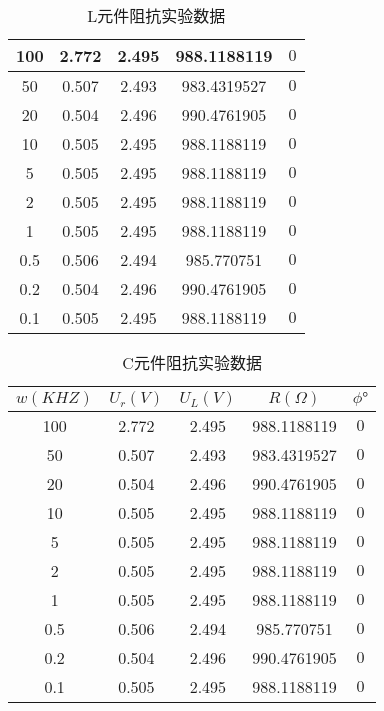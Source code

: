 \documentclass[dvipsnames, svgnames,a4paper,11pt]{article}
\begin{document}
\begin{enumerate}
\begin{table}[h]
\begin{tabular}{|c|c|c|c|c|}
				100   & 2.772 & 2.495 & 988.1188119 & $0 $\\
				\hline
				50  & 0.507 & 2.493 & 983.4319527 &$0 $\\
				\hline
				20   & 0.504 & 2.496 & 990.4761905 & $0 $\\
				\hline
				10  & 0.505 & 2.495 & 988.1188119 &$0 $ \\
				\hline
				5   & 0.505 & 2.495 & 988.1188119 &$0 $ \\
				\hline
				2   & 0.505 & 2.495 & 988.1188119 & $0 $\\
				\hline
				1   & 0.505 & 2.495 & 988.1188119 & $0 $\\
				\hline
				0.5   & 0.506 & 2.494 & 985.770751 & $0 $\\
				\hline
				0.2   & 0.504 & 2.496 & 990.4761905 & $0 $\\
				\hline
				0.1   & 0.505 & 2.495 &988.1188119 &$0 $ \\
				\hline
				
				\end{tabular}
				\caption{L元件阻抗实验数据}
				
				\end{table}
				\begin{table}[h]
					\centering
					\begin{tabular}{|c|c|c|c|c|}
					\hline
					$w(KHZ)$ & $U_r(V)$ & $U_L(V)$ & $R(\Omega)$ & $\phi °$ \\
					\hline
					
					100   & 2.772 & 2.495 & 988.1188119 & $0 $\\
					\hline
					50  & 0.507 & 2.493 & 983.4319527 &$0 $\\
					\hline
					20   & 0.504 & 2.496 & 990.4761905 & $0 $\\
					\hline
					10  & 0.505 & 2.495 & 988.1188119 &$0 $ \\
					\hline
					5   & 0.505 & 2.495 & 988.1188119 &$0 $ \\
					\hline
					2   & 0.505 & 2.495 & 988.1188119 & $0 $\\
					\hline
					1   & 0.505 & 2.495 & 988.1188119 & $0 $\\
					\hline
					0.5   & 0.506 & 2.494 & 985.770751 & $0 $\\
					\hline
					0.2   & 0.504 & 2.496 & 990.4761905 & $0 $\\
					\hline
					0.1   & 0.505 & 2.495 &988.1188119 &$0 $ \\
					\hline
					
					\end{tabular}
					\caption{C元件阻抗实验数据}
					
					\end{table}
			
	\end{enumerate}	
	
\end{document}
